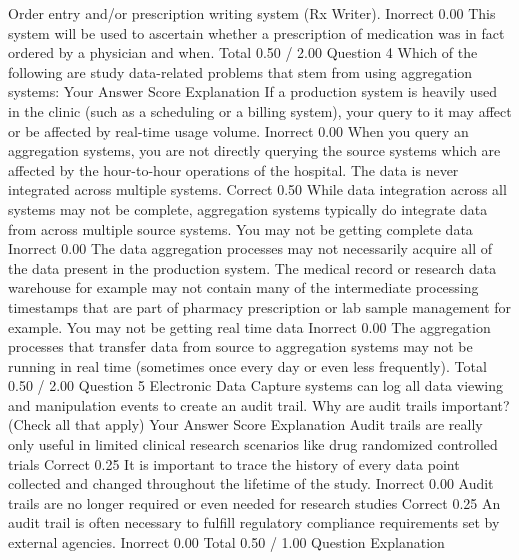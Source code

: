 Order entry and/or prescription writing system (Rx Writer).	Inorrect	0.00	This system will be used to ascertain whether a prescription of medication was in fact ordered by a physician and when.
Total		0.50 / 2.00	
Question 4
Which of the following are study data-related problems that stem from using aggregation systems:
Your Answer		Score	Explanation
If a production system is heavily used in the clinic (such as a scheduling or a billing system), your query to it may affect or be affected by real-time usage volume.	Inorrect	0.00	When you query an aggregation systems, you are not directly querying the source systems which are affected by the hour-to-hour operations of the hospital.
The data is never integrated across multiple systems.	Correct	0.50	While data integration across all systems may not be complete, aggregation systems typically do integrate data from across multiple source systems.
You may not be getting complete data	Inorrect	0.00	The data aggregation processes may not necessarily acquire all of the data present in the production system. The medical record or research data warehouse for example may not contain many of the intermediate processing timestamps that are part of pharmacy prescription or lab sample management for example.
You may not be getting real time data	Inorrect	0.00	The aggregation processes that transfer data from source to aggregation systems may not be running in real time (sometimes once every day or even less frequently).
Total		0.50 / 2.00	
Question 5
Electronic Data Capture systems can log all data viewing and manipulation events to create an audit trail. Why are audit trails important? (Check all that apply)
Your Answer		Score	Explanation
Audit trails are really only useful in limited clinical research scenarios like drug randomized controlled trials	Correct	0.25	
It is important to trace the history of every data point collected and changed throughout the lifetime of the study.	Inorrect	0.00	
Audit trails are no longer required or even needed for research studies	Correct	0.25	
An audit trail is often necessary to fulfill regulatory compliance requirements set by external agencies.	Inorrect	0.00	
Total		0.50 / 1.00	
Question Explanation


